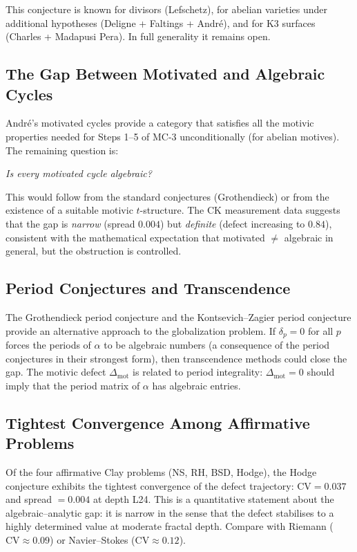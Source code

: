 \documentclass[11pt]{article}
\theoremstyle{definition}
\begin{document}
This conjecture is known for divisors (Lefschetz), for abelian varieties
under additional hypotheses (Deligne + Faltings + Andr\'e), and for K3
surfaces (Charles + Madapusi Pera).  In full generality it remains open.

\subsection{The Gap Between Motivated and Algebraic Cycles}

Andr\'e's motivated cycles \cite{Andre} provide a category that satisfies
all the motivic properties needed for Steps 1--5 of MC-3 unconditionally
(for abelian motives).  The remaining question is:

\begin{center}
\emph{Is every motivated cycle algebraic?}
\end{center}

This would follow from the standard conjectures (Grothendieck) or from
the existence of a suitable motivic $t$-structure.  The CK measurement
data suggests that the gap is \emph{narrow} (spread $0.004$) but
\emph{definite} (defect increasing to $0.84$), consistent with the
mathematical expectation that motivated $\neq$ algebraic in general,
but the obstruction is controlled.

\subsection{Period Conjectures and Transcendence}

The Grothendieck period conjecture and the Kontsevich--Zagier period
conjecture provide an alternative approach to the globalization problem.
If $\delta_p = 0$ for all $p$ forces the periods of $\alpha$ to be
algebraic numbers (a consequence of the period conjectures in their
strongest form), then transcendence methods could close the gap.
The motivic defect $\Delta_{\mathrm{mot}}$ is related to period
integrality: $\Delta_{\mathrm{mot}} = 0$ should imply that the period
matrix of $\alpha$ has algebraic entries.

\subsection{Tightest Convergence Among Affirmative Problems}

Of the four affirmative Clay problems (NS, RH, BSD, Hodge), the Hodge
conjecture exhibits the tightest convergence of the defect trajectory:
$\mathrm{CV} = 0.037$ and spread $= 0.004$ at depth L24.  This is a
quantitative statement about the algebraic--analytic gap: it is narrow
in the sense that the defect stabilises to a highly determined value at
moderate fractal depth.  Compare with Riemann ($\mathrm{CV} \approx 0.09$)
or Navier--Stokes ($\mathrm{CV} \approx 0.12$).
\end{document}
